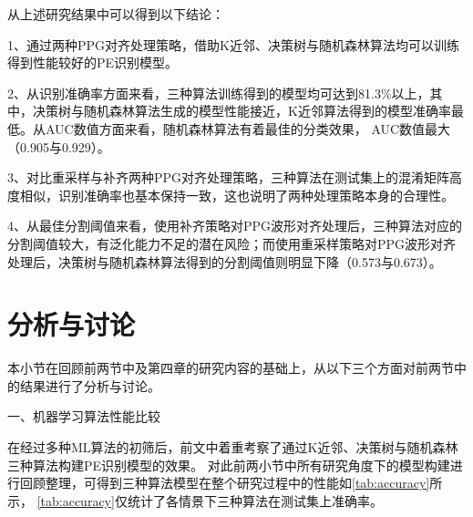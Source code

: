 从上述研究结果中可以得到以下结论：

1、通过两种PPG对齐处理策略，借助K近邻、决策树与随机森林算法均可以训练得到性能较好的PE识别模型。

2、从识别准确率方面来看，三种算法训练得到的模型均可达到81.3\%以上，其中，决策树与随机森林算法生成的模型性能接近，K近邻算法得到的模型准确率最低。从AUC数值方面来看，随机森林算法有着最佳的分类效果，
AUC数值最大（0.905与0.929）。

3、对比重采样与补齐两种PPG对齐处理策略，三种算法在测试集上的混淆矩阵高度相似，识别准确率也基本保持一致，这也说明了两种处理策略本身的合理性。

4、从最佳分割阈值来看，使用补齐策略对PPG波形对齐处理后，三种算法对应的分割阈值较大，有泛化能力不足的潜在风险；而使用重采样策略对PPG波形对齐处理后，决策树与随机森林算法得到的分割阈值则明显下降（0.573与0.673）。

\section{分析与讨论}
本小节在回顾前两节中及第四章的研究内容的基础上，从以下三个方面对前两节中的结果进行了分析与讨论。

一、机器学习算法性能比较

在经过多种ML算法的初筛后，前文中着重考察了通过K近邻、决策树与随机森林三种算法构建PE识别模型的效果。
对此前两小节中所有研究角度下的模型构建进行回顾整理，可得到三种算法模型在整个研究过程中的性能如\autoref{tab:accuracy}所示，
\autoref{tab:accuracy}仅统计了各情景下三种算法在测试集上准确率。

